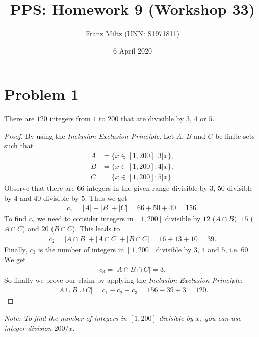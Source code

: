 \documentclass{article}
\title{PPS: Homework 9 (Workshop 33)}
\author{Franz Miltz (UNN: S1971811)}
\date{6 April 2020}
\begin{document}
\maketitle

\section*{Problem 1}
\begin{claim}
  There are $120$ integers from $1$ to $200$ that are divisible by $3$, $4$ or $5$.
\end{claim}
\begin{proof}
  By using the \emph{Inclusion-Exclusion Principle}.
   Let $A$, $B$ and $C$ be finite sets such that
  \begin{align*}
    A &= \{x\in [1,200] : 3 | x\},\\
    B &= \{x \in [1,200] : 4|x\},\\
    C &= \{x\in [1,200] : 5|x\}
  \end{align*} 
  Observe that there are $66$ integers in the given range divisible by $3$, $50$ divisible by $4$ and $40$ divisible by $5$. 
  Thus we get
  \begin{align*}
    c_1 = |A| + |B| + |C| = 66 + 50 + 40 = 156.
  \end{align*}
  To find $c_2$ we need to consider integers in $[1,200]$ divisible by $12$ ($A\cap B$), $15$ ($A\cap C$) and $20$ ($B\cap C$). This leads to
  \begin{align*}
    c_2 = |A\cap B| + |A\cap C| + |B \cap C| = 16 + 13 + 10 = 39.
  \end{align*}
  Finally, $c_3$ is the number of integers in $[1,200]$ divisible by $3$, $4$ and $5$, i.e. $60$. We get
  \begin{align*}
    c_3 = |A\cap B \cap C| = 3.
  \end{align*}
  So finally we prove our claim by applying the \emph{Inclusion-Exclusion Principle}:
  \begin{align*}
    |A\cup B \cup C| = c_1- c_2 + c_3 = 156 - 39 + 3 = 120.
  \end{align*}
\end{proof}
\noindent\emph{Note: To find the number of integers in $[1,200]$ divisible by $x$, you can use integer division $200 / x$}.
\end{document}
